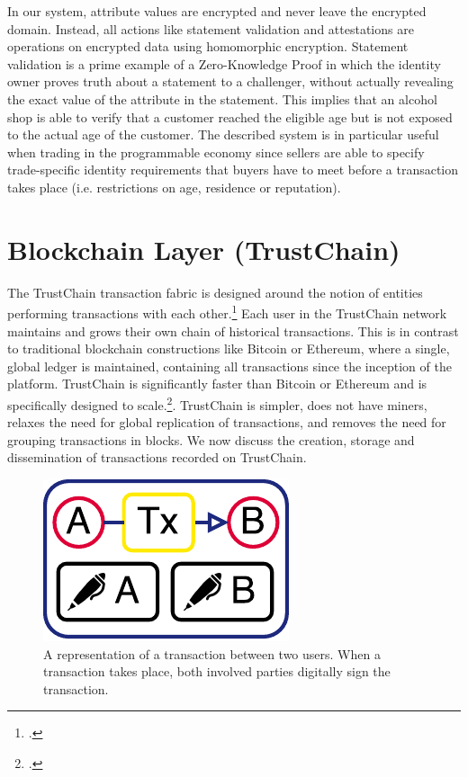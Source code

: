 \documentclass[USenglish]{article}
\begin{document}
In our system, attribute values are encrypted and never leave the encrypted domain.
Instead, all actions like statement validation and attestations are operations on encrypted data using homomorphic encryption.
Statement validation is a prime example of a Zero-Knowledge Proof in which the identity owner proves truth about a statement to a challenger, without actually revealing the exact value of the attribute in the statement.
This implies that an alcohol shop is able to verify that a customer reached the eligible age but is not exposed to the actual age of the customer.
The described system is in particular useful when trading in the programmable economy since sellers are able to specify trade-specific identity requirements that buyers have to meet before a transaction takes place (i.e. restrictions on age, residence or reputation).

\section{Blockchain Layer (TrustChain)}
\label{sec:trustchain}
The TrustChain transaction fabric is designed around the notion of entities performing transactions with each other.\footcite{otte2017trustchain}
Each user in the TrustChain network maintains and grows their own chain of historical transactions. 
This is in contrast to traditional blockchain constructions like Bitcoin or Ethereum, where a single, global ledger is maintained, containing all transactions since the inception of the platform.
TrustChain is significantly faster than Bitcoin or Ethereum and is specifically designed to scale.\footcite{githubissueconsensus}.
TrustChain is simpler, does not have miners, relaxes the need for global replication of transactions, and removes the need for grouping transactions in blocks.
We now discuss the creation, storage and dissemination of transactions recorded on TrustChain.

\begin{figure}[h!]
	\centering
	\includegraphics[width=0.3\columnwidth]{assets/trustchain_tutorial_1}
	\caption{A representation of a transaction between two users. When a transaction takes place, both involved parties digitally sign the transaction.}
	\label{fig:trustchain_tutorial_1}
\end{figure}
\end{document}
